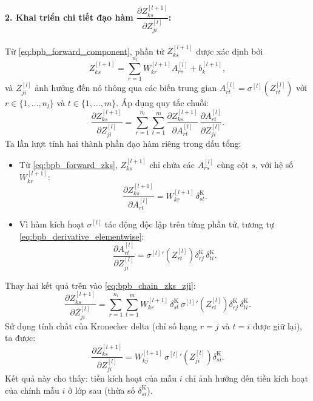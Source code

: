 \paragraph{2. Khai triển chi tiết đạo hàm $\dfrac{\partial Z_{ks}^{[l+1]}}{\partial Z_{ji}^{[l]}}$:}
Từ \eqref{eq:bpb_forward_component}, phần tử $Z_{ks}^{[l+1]}$ được xác định bởi
\begin{equation}
Z_{ks}^{[l+1]} = \sum_{r=1}^{n_l} W_{kr}^{[l+1]} A_{rs}^{[l]} + b_k^{[l+1]},
\label{eq:bpb_forward_zks}
\end{equation}
và $Z_{ji}^{[l]}$ ảnh hưởng đến nó thông qua các biến trung gian $A_{rt}^{[l]} = \sigma^{[l]}\!\left(Z_{rt}^{[l]}\right)$ với $r \in \{1,\dots,n_l\}$ và $t \in \{1,\dots,m\}$. Áp dụng quy tắc chuỗi:
\begin{equation}
\frac{\partial Z_{ks}^{[l+1]}}{\partial Z_{ji}^{[l]}} = \sum_{r=1}^{n_l}\sum_{t=1}^{m} \frac{\partial Z_{ks}^{[l+1]}}{\partial A_{rt}^{[l]}}\,\frac{\partial A_{rt}^{[l]}}{\partial Z_{ji}^{[l]}}.
\label{eq:bpb_chain_zks_zji}
\end{equation}
Ta lần lượt tính hai thành phần đạo hàm riêng trong dấu tổng:
\begin{itemize}
    \item Từ \eqref{eq:bpb_forward_zks}, $Z_{ks}^{[l+1]}$ chỉ chứa các $A_{rs}^{[l]}$ cùng cột $s$, với hệ số $W_{kr}^{[l+1]}$:
    \begin{equation}
    \frac{\partial Z_{ks}^{[l+1]}}{\partial A_{rt}^{[l]}} = W_{kr}^{[l+1]}\,\delta^{\mathrm{K}}_{st}.
    \end{equation}
    \item Vì hàm kích hoạt $\sigma^{[l]}$ tác động độc lập trên từng phần tử, tương tự \eqref{eq:bpb_derivative_elementwise}:
    \begin{equation}
    \frac{\partial A_{rt}^{[l]}}{\partial Z_{ji}^{[l]}} = {\sigma^{[l]}}'\!\left(Z_{rt}^{[l]}\right)\delta^{\mathrm{K}}_{rj}\,\delta^{\mathrm{K}}_{ti}.
    \end{equation}
\end{itemize}
Thay hai kết quả trên vào \eqref{eq:bpb_chain_zks_zji}:
\begin{equation}
\frac{\partial Z_{ks}^{[l+1]}}{\partial Z_{ji}^{[l]}} = \sum_{r=1}^{n_l}\sum_{t=1}^{m} W_{kr}^{[l+1]}\,\delta^{\mathrm{K}}_{st}\,{\sigma^{[l]}}'\!\left(Z_{rt}^{[l]}\right)\delta^{\mathrm{K}}_{rj}\,\delta^{\mathrm{K}}_{ti}.
\end{equation}
Sử dụng tính chất của Kronecker delta (chỉ số hạng $r = j$ và $t = i$ được giữ lại), ta được:
\begin{equation}
\frac{\partial Z_{ks}^{[l+1]}}{\partial Z_{ji}^{[l]}} = W_{kj}^{[l+1]}\,{\sigma^{[l]}}'\!\left(Z_{ji}^{[l]}\right)\delta^{\mathrm{K}}_{si}.
\label{eq:bpb_zks_zji_final}
\end{equation}
Kết quả này cho thấy: tiền kích hoạt của mẫu $i$ chỉ ảnh hưởng đến tiền kích hoạt của chính mẫu $i$ ở lớp sau (thừa số $\delta^{\mathrm{K}}_{si}$).
 
